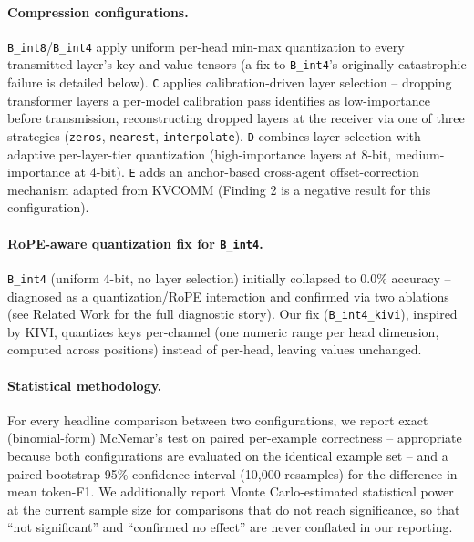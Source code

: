 \documentclass[11pt]{article}
\begin{document}
\paragraph{Compression configurations.} \texttt{B\_int8}/\texttt{B\_int4}
apply uniform per-head min-max quantization to every transmitted layer's
key and value tensors (a fix to \texttt{B\_int4}'s originally-catastrophic
failure is detailed below). \texttt{C} applies calibration-driven layer
selection -- dropping transformer layers a per-model calibration pass
identifies as low-importance before transmission, reconstructing dropped
layers at the receiver via one of three strategies (\texttt{zeros},
\texttt{nearest}, \texttt{interpolate}). \texttt{D} combines layer
selection with adaptive per-layer-tier quantization (high-importance
layers at 8-bit, medium-importance at 4-bit). \texttt{E} adds an
anchor-based cross-agent offset-correction mechanism adapted from KVCOMM
(Finding 2 is a negative result for this configuration).

\paragraph{RoPE-aware quantization fix for \texttt{B\_int4}.}
\texttt{B\_int4} (uniform 4-bit, no layer selection) initially collapsed
to 0.0\% accuracy -- diagnosed as a quantization/RoPE interaction and
confirmed via two ablations (see Related Work for the full diagnostic
story). Our fix (\texttt{B\_int4\_kivi}), inspired by KIVI, quantizes keys
per-channel (one numeric range per head dimension, computed across
positions) instead of per-head, leaving values unchanged.

\paragraph{Statistical methodology.} For every headline comparison between
two configurations, we report exact (binomial-form) McNemar's test on
paired per-example correctness -- appropriate because both configurations
are evaluated on the identical example set -- and a paired bootstrap 95\%
confidence interval (10,000 resamples) for the difference in mean
token-F1. We additionally report Monte Carlo-estimated statistical power
at the current sample size for comparisons that do not reach significance,
so that ``not significant'' and ``confirmed no effect'' are never
conflated in our reporting.
\end{document}
